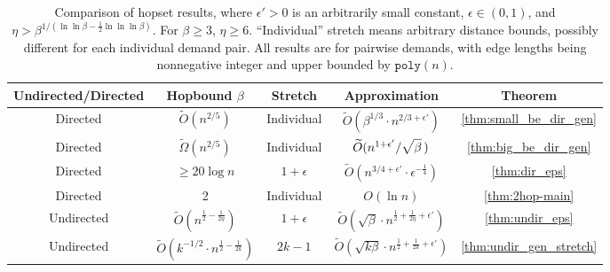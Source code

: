 \documentclass{article}
\theoremstyle{definition}
\theoremstyle{remark}
\def\be    {\beta}
\begin{document}
\begin{table}[h]
    \centering
    \begin{tabular}{|c|c|c|c|c|}
        \hline
        \textbf{Undirected/Directed} & \textbf{Hopbound $\beta$} & \textbf{Stretch} & \textbf{Approximation} & \textbf{Theorem} \\ \hline

        Directed & $\widetilde{O}(n^{2/5})$  & Individual & $\widetilde{O}(\beta^{1/3} \cdot n^{2/3 + \epsilon'})$ & \ref{thm:small_be_dir_gen} \\ \hline
        
        Directed & $\widetilde{\Omega}(n^{2/5})$ & Individual & $\widetilde{O}(n^{1+\epsilon'}/ \sqrt{\vphantom{\beta^K} \be} \, )$ & \ref{thm:big_be_dir_gen} \\ \hline

        Directed & $\geq 20\log{n}$ & $1+\epsilon$ & $\widetilde{O}(n^{3/4 + \epsilon'} \cdot \epsilon^{-\frac{1}{4}})$ & \ref{thm:dir_eps}  \\ \hline
        
        Directed & 2 & Individual & $O(\ln{n})$ & \ref{thm:2hop-main} \\ \hline

        Undirected & $\widetilde{O}(n^{\frac{1}{2} - \frac{1}{2\eta}})$ & $1+\epsilon$ & $\widetilde{O}(\sqrt{ \be} \cdot n^{\frac{1}{2} + \frac{1}{2\eta} + \epsilon'})$ & \ref{thm:undir_eps} \\ \hline

        Undirected & $\widetilde{O}(k^{-1/2} \cdot n^{\frac{1}{2} - \frac{1}{2k}})$ & $2k-1$ & $\widetilde{O}(\sqrt{k \be} \cdot n^{\frac{1}{2} + \frac{1}{2k} + \epsilon'})$ & \ref{thm:undir_gen_stretch}  \\ \hline

    \end{tabular}
    \caption{Comparison of hopset results, where $\epsilon' > 0$ is an arbitrarily small constant, $\epsilon \in (0,1)$, and $\eta > \be^{1/(\ln{\ln{\be}}-\frac{1}{2}\ln{\ln{\ln{\be}}})}$. For $\be \geq 3$, $\eta \geq 6$. ``Individual'' stretch means arbitrary distance bounds, possibly different for each individual demand pair. All results are for pairwise demands, with edge lengths being nonnegative integer and upper bounded by $\texttt{poly}(n)$. }
    \label{tab:results}
\end{table}
\end{document}
